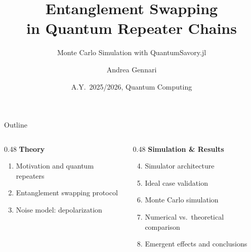 \documentclass[aspectratio=169, 11pt]{beamer}
\title{Entanglement Swapping \\ in Quantum Repeater Chains}
\subtitle{Monte Carlo Simulation with QuantumSavory.jl}
\author{Andrea Gennari}
\date{A.Y.\ 2025/2026, Quantum Computing}
\begin{document}
\begin{frame}
  \titlepage
\end{frame}

\begin{frame}{Outline}
  \begin{columns}[T]
    \begin{column}{0.48\textwidth}
      \textbf{\textcolor{qBlue}{Theory}}
      \begin{enumerate}
        \item Motivation and quantum repeaters
        \item Entanglement swapping protocol
        \item Noise model: depolarization
      \end{enumerate}
    \end{column}
    \begin{column}{0.48\textwidth}
      \textbf{\textcolor{qCyan}{Simulation \& Results}}
      \begin{enumerate}\setcounter{enumi}{3}
        \item Simulator architecture
        \item Ideal case validation
        \item Monte Carlo simulation
        \item Numerical vs.\ theoretical comparison
        \item Emergent effects and conclusions
      \end{enumerate}
    \end{column}
  \end{columns}
\end{frame}
\end{document}
